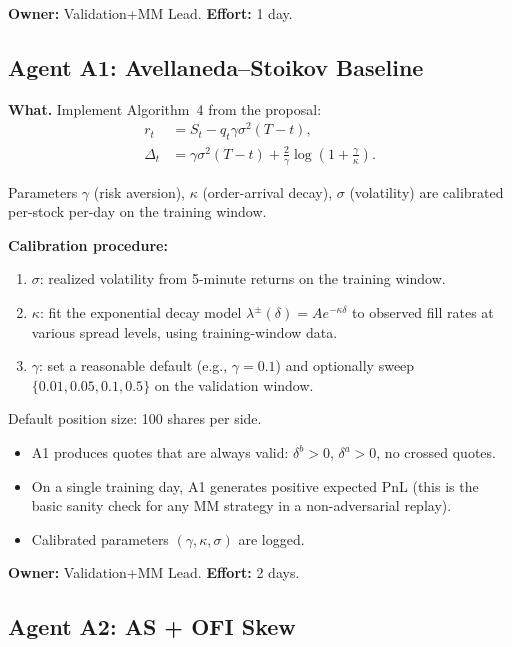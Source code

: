 \documentclass[11pt,a4paper]{article}
\begin{document}
\textbf{Owner:} Validation+MM Lead. \quad \textbf{Effort:} 1 day.

\subsection{Agent A1: Avellaneda--Stoikov Baseline}

\textbf{What.}
Implement Algorithm~4 from the proposal:
\begin{align*}
  r_t &= S_t - q_t \gamma \sigma^2 (T - t), \\
  \Delta_t &= \gamma \sigma^2 (T - t) + \frac{2}{\gamma} \log\!\left(1 + \frac{\gamma}{\kappa}\right).
\end{align*}

Parameters $\gamma$ (risk aversion), $\kappa$ (order-arrival decay), $\sigma$ (volatility) are calibrated per-stock per-day on the training window.

\textbf{Calibration procedure:}
\begin{enumerate}[nosep]
  \item $\sigma$: realized volatility from 5-minute returns on the training window.
  \item $\kappa$: fit the exponential decay model $\lambda^{\pm}(\delta) = A e^{-\kappa \delta}$ to observed fill rates at various spread levels, using training-window data.
  \item $\gamma$: set a reasonable default (e.g., $\gamma = 0.1$) and optionally sweep $\{0.01, 0.05, 0.1, 0.5\}$ on the validation window.
\end{enumerate}

Default position size: 100 shares per side.

\begin{successbox}
  \begin{itemize}[nosep]
    \item A1 produces quotes that are always valid: $\delta^b > 0$, $\delta^a > 0$, no crossed quotes.
    \item On a single training day, A1 generates positive expected PnL (this is the basic sanity check for any MM strategy in a non-adversarial replay).
    \item Calibrated parameters $(\gamma, \kappa, \sigma)$ are logged.
  \end{itemize}
\end{successbox}

\textbf{Owner:} Validation+MM Lead. \quad \textbf{Effort:} 2 days.

\subsection{Agent A2: AS + OFI Skew}
\end{document}
